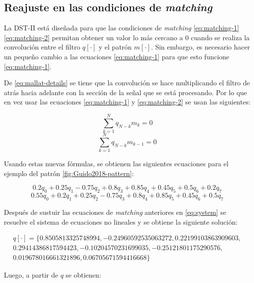 \subsection{Reajuste en las condiciones de \textit{matching}}

La DST-II está diseñada para que las condiciones de \textit{matching} \ref{eq:matching-1} \ref{eq:matching-2} 
permitan obtener un valor lo más cercano a $0$ cuando se realiza la convolución entre el filtro $q[\cdot]$
y el patrón $m[\cdot]$. Sin embargo, es necesario hacer un pequeño cambio a las ecuaciones \ref{eq:matching-1}
para que esto funcione \ref{eq:matching-1}.

De \ref{eq:mallat-details} se tiene que la convolución se hace multiplicando el filtro de atrás hacia adelante 
con la sección de la señal que se está procesando. Por lo que en vez usar las ecuaciones \ref{eq:matching-1}
y \ref{eq:matching-2} se usan las siguientes:

\begin{equation}\label{eq:matching-1}
	\sum_{k=1}^{N} q_{N-k}m_{k} = 0
\end{equation}
\begin{equation}\label{eq:matching-2}
	\sum_{k=1}^{N} q_{N-k}m_{k-1} = 0
\end{equation}

Usando estas nuevas fórmulas, se obtienen las siguientes ecuaciones para el ejemplo del patrón \ref{fig:Guido2018-pattern}:

\begin{equation}
	0.2q_0 + 0.25q_1 - 0.75q_2 + 0.8q_3 + 0.85q_4 + 0.45q_5 + 0.5q_6 + 0.2q_7
\end{equation}
\begin{equation}
	0.55q_0 + 0.2q_1 + 0.25q_2 - 0.75q_3 + 0.8q_4 + 0.85q_5 + 0.45q_6 + 0.5q_7
\end{equation}

Después de sustuir las ecuaciones de \textit{matching} anteriores en \ref{eq:system} se resuelve el sistema
de ecuaciones no lineales y se obtiene la siguiente solución:

$$
	\begin{array}{lcl}
		q[\cdot] = \{ 0.8505813325748994, -0.24960592535063272, 0.22199103863909603,\\ 
			0.29414386817594423, -0.10204570231699035, -0.25121801175290576, \\ 
		0.019678016661321896, 0.06705671594416668 \}
	\end{array}
$$

Luego, a partir de $q$ se obtienen:

